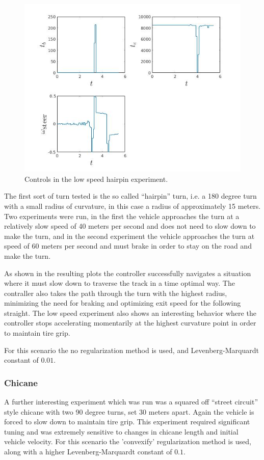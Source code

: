 \documentclass[conference,11pt]{IEEEtran}
\begin{document}
\begin{figure}[b]
  \centering
  \includegraphics[scale=0.5]{hairpin_lift_u.jpg}
  \caption{Controls in the low speed hairpin experiment.}
  \label{fig:cg}
\end{figure}

The first sort of turn tested is the so called ``hairpin'' turn, i.e. a 180 degree turn with a small radius of curvature, in this case a radius of approximately 15 meters. Two experiments were run,
in the first the vehicle approaches the turn at a relatively slow speed of 40 meters per second and does not need to slow down to make the turn, and in the second experiment the vehicle approaches
the turn at speed of 60 meters per second and must brake in order to stay on the road and make the turn.

As shown in the resulting plots the controller successfully navigates a situation where it must slow down to traverse the track in a time optimal way. The contraller also takes the path through the
turn with the highest radius, minimizing the need for braking and optimizing exit speed for the following straight. The low speed experiment also shows an interesting behavior where the controller
stops accelerating momentarily at the highest curvature point in order to maintain tire grip.

For this scenario the no regularization method is used, and Levenberg-Marquardt constant of $0.01$.

\subsubsection{Chicane}
A further interesting experiment which was run was a squared off ``street circuit'' style chicane with two 90 degree turns, set 30 meters apart. Again the vehicle is forced to slow down to
maintain tire grip. This experiment required significant tuning and was extremely sensitive to changes in chicane length and initial vehicle velocity. For this scenario the 'convexify' regularization
method is used, along with a higher Levenberg-Marquardt constant of $0.1$.
\end{document}
